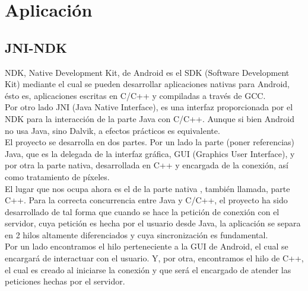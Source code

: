\section{Aplicación}
\subsection{JNI-NDK}
NDK, Native Development Kit, de Android es el SDK (Software Development Kit) mediante el cual se pueden desarrollar aplicaciones nativas para Android, ésto es, aplicaciones escritas en C/C++ y compiladas a través de GCC.\\

Por otro lado JNI (Java Native Interface), es una interfaz proporcionada por el NDK para la interacción de la parte Java con C/C++. Aunque si bien Android no usa Java, sino Dalvik, a efectos prácticos es equivalente.\\

El proyecto se desarrolla en dos partes. Por un lado la parte (poner referencias) Java, que es la delegada de la interfaz gráfica, GUI (Graphics User Interface), y por otra la parte nativa, desarrollada en C++ y encargada de la conexión, así como tratamiento de píxeles.\\

El lugar que nos ocupa ahora es el de la parte nativa , también llamada, parte C++. Para la correcta concurrencia entre Java y C/C++, el proyecto ha sido desarrollado de tal forma que cuando se hace la petición de conexión con el servidor, cuya petición es hecha por el usuario desde Java, la aplicación se separa en 2 hilos altamente diferenciados y cuya sincronización es fundamental.\\

Por un lado encontramos el hilo perteneciente a la GUI de Android, el cual se encargará de interactuar con el usuario. Y, por otra, encontramos el hilo de C++, el cual es creado al iniciarse la conexión y que será el encargado de atender las peticiones hechas por el servidor.\\

